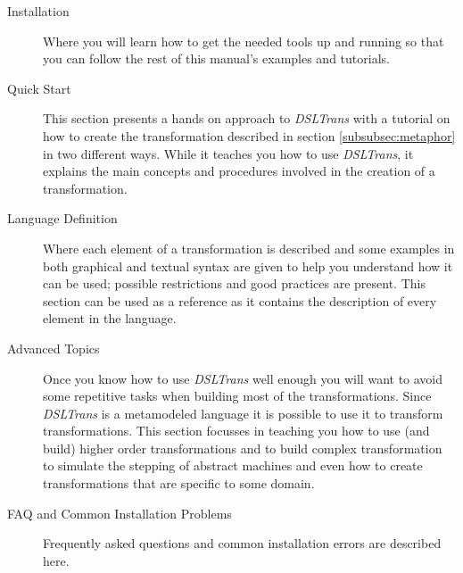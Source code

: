 \begin{description}
  \item[Installation] Where you will learn how to get the needed
  tools up and running so that you can follow the rest of this manual's examples
  and tutorials.
  \item[Quick Start] This section presents a hands on approach to
  \emph{DSLTrans} with a tutorial on how to create the transformation described
  in section \ref{subsubsec:metaphor} in two different ways. While it teaches
  you how to use \emph{DSLTrans}, it explains the main concepts and procedures
  involved in the creation of a transformation.
  \item[Language Definition] Where each element of a transformation is described
  and some examples in both graphical and textual syntax are given to help you
  understand how it can be used; possible restrictions and good practices are
  present. This section can be used as a reference as it contains the
  description of every element in the language.
  \item[Advanced Topics] Once you know how to use \emph{DSLTrans} well enough
  you will want to avoid some repetitive tasks when building most of the
  transformations. Since \emph{DSLTrans} is a metamodeled language it is
  possible to use it to transform transformations. This section focusses in
  teaching you how to use (and build) higher order transformations and to build
  complex transformation to simulate the stepping of abstract machines and even
  how to create transformations that are specific to some domain.
  \item[FAQ and Common Installation Problems] Frequently asked questions and common installation errors are
  described here.
\end{description}

\clearpage
